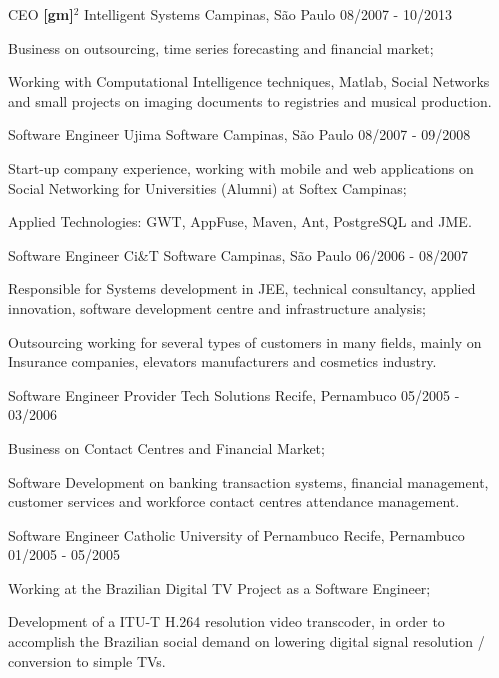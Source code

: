 \begin{cventries}
\cventry
{CEO}
{\textbf{[gm]}$^2$ Intelligent Systems}
{Campinas, São Paulo}
{08/2007 - 10/2013}
{
\begin{cvitems}
\item Business on outsourcing, time series forecasting and financial market;
\item Working with Computational Intelligence techniques, Matlab, Social Networks and small projects on imaging documents to registries and musical production.
\end{cvitems}
}

\cventry
{Software Engineer}
{Ujima Software}
{Campinas, São Paulo}
{08/2007 - 09/2008}
{
\begin{cvitems}
\item Start-up company experience, working with mobile and web applications on Social Networking for Universities (Alumni) at Softex Campinas;
\item Applied Technologies: GWT, AppFuse, Maven, Ant, PostgreSQL and JME.
\end{cvitems}
}

\cventry
{Software Engineer}
{Ci\&T Software}
{Campinas, São Paulo}
{06/2006 - 08/2007}
{
\begin{cvitems}
\item Responsible for Systems development in JEE, technical consultancy, applied innovation, software development centre and infrastructure analysis;
\item Outsourcing working for several types of customers in many fields, mainly on Insurance companies, elevators manufacturers and cosmetics industry.
\end{cvitems}
}

\cventry
{Software Engineer}
{Provider Tech Solutions}
{Recife, Pernambuco}
{05/2005 - 03/2006}
{
\begin{cvitems}
\item Business on Contact Centres and Financial Market;
\item Software Development on banking transaction systems, financial management, customer services and workforce contact centres attendance management.
\end{cvitems}
}

\cventry
{Software Engineer}
{Catholic University of Pernambuco}
{Recife, Pernambuco}
{01/2005 - 05/2005}
{
\begin{cvitems}
\item Working at the Brazilian Digital TV Project as a Software Engineer;
\item Development of a ITU-T H.264 resolution video transcoder, in order to accomplish the Brazilian social demand on lowering digital signal resolution / conversion to simple TVs.
\end{cvitems}
}


\end{cventries}
